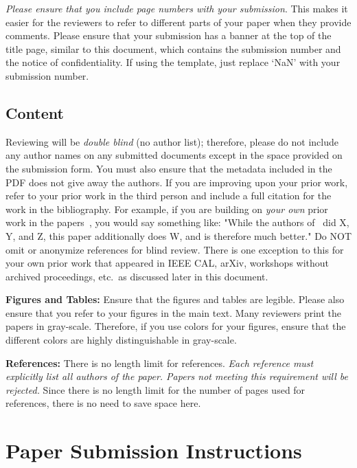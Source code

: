 \documentclass[conference]{IEEEtran}
\begin{document}
{\em Please ensure that you include page numbers with your
  submission}. This makes it easier for the reviewers to refer to
different parts of your paper when they provide comments. Please
ensure that your submission has a banner at the top of the title page,
similar to this document, which contains the submission number and the
notice of confidentiality.  If using the template, just replace `NaN'
with your submission number.

\subsection{Content}
Reviewing will be {\em double blind} (no author list); therefore,
please do not include any author names on any submitted documents
except in the space provided on the submission form.  You must also
ensure that the metadata included in the PDF does not give away the
authors. If you are improving upon your prior work, refer to your
prior work in the third person and include a full citation for the
work in the bibliography.  For example, if you are building on {\em
  your own} prior work in the
papers~\cite{nicepaper1,nicepaper2,nicepaper3}, you would say
something like: "While the authors of~\cite{nicepaper1,nicepaper2,nicepaper3} did X,
Y, and Z, this paper additionally does W, and is therefore much
better."  Do NOT omit or anonymize references for blind review.  There
is one exception to this for your own prior work that appeared in IEEE
CAL, arXiv, workshops without archived proceedings, etc.\ as
discussed later in this document.

\noindent\textbf{Figures and Tables:} Ensure that the figures and
tables are legible.  Please also ensure that you refer to your figures
in the main text.  Many reviewers print the papers in
gray-scale. Therefore, if you use colors for your figures, ensure that
the different colors are highly distinguishable in gray-scale.

\noindent\textbf{References:}  There is no length limit for
references. {\em Each reference must explicitly list all authors of
  the paper.  Papers not meeting this requirement will be rejected.}
Since there is no length limit for the number of pages
used for references, there is no need to save space here.


\section{Paper Submission Instructions}
\end{document}
